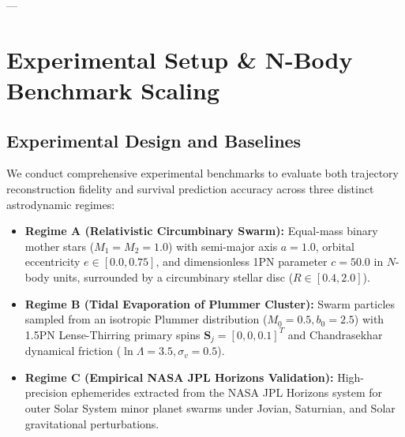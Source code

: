 \documentclass[preprint,12pt,3p]{elsarticle}
\begin{document}
---

\section{Experimental Setup \& N-Body Benchmark Scaling}\label{sec:experiments}

\subsection{Experimental Design and Baselines}
We conduct comprehensive experimental benchmarks to evaluate both trajectory reconstruction fidelity and survival prediction accuracy across three distinct astrodynamic regimes:
\begin{itemize}
    \item \textbf{Regime A (Relativistic Circumbinary Swarm):} Equal-mass binary mother stars ($M_1 = M_2 = 1.0$) with semi-major axis $a = 1.0$, orbital eccentricity $e \in [0.0, 0.75]$, and dimensionless 1PN parameter $c = 50.0$ in $N$-body units, surrounded by a circumbinary stellar disc ($R \in [0.4, 2.0]$).
    \item \textbf{Regime B (Tidal Evaporation of Plummer Cluster):} Swarm particles sampled from an isotropic Plummer distribution ($M_0 = 0.5, b_0 = 2.5$) with 1.5PN Lense-Thirring primary spins $\bm{S}_j = [0, 0, 0.1]^T$ and Chandrasekhar dynamical friction ($\ln\Lambda = 3.5, \sigma_v = 0.5$).
    \item \textbf{Regime C (Empirical NASA JPL Horizons Validation):} High-precision ephemerides extracted from the NASA JPL Horizons system for outer Solar System minor planet swarms under Jovian, Saturnian, and Solar gravitational perturbations.
\end{itemize}
\end{document}
